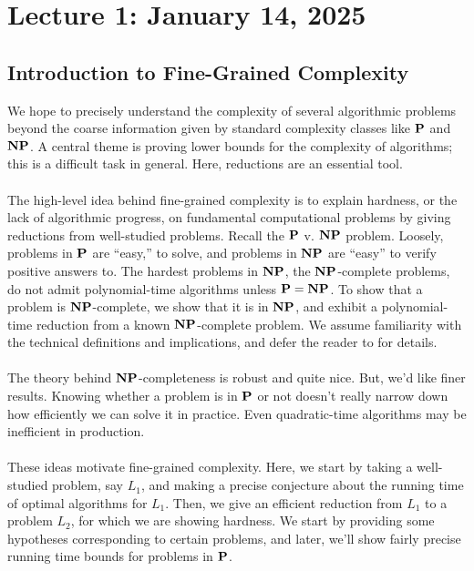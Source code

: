 \section{Lecture 1: January 14, 2025}

    \subsection{Introduction to Fine-Grained Complexity}
    
        We hope to precisely understand the complexity of several algorithmic problems beyond the coarse information given by standard complexity classes like \(\mathbf{P}\) and \(\mathbf{NP}\). A central theme is proving lower bounds for the complexity of algorithms; this is a difficult task in general. Here, reductions are an essential tool.
        \\
        \\
        The high-level idea behind fine-grained complexity is to explain hardness, or the lack of algorithmic progress, on fundamental computational problems by giving reductions from well-studied problems. Recall the \(\mathbf{P}\) v. \(\mathbf{NP}\) problem. Loosely, problems in \(\mathbf{P}\) are ``easy,'' to solve, and problems in \(\mathbf{NP}\) are ``easy'' to verify positive answers to. The hardest problems in \(\mathbf{NP}\), the \(\mathbf{NP}\)-complete problems, do not admit polynomial-time algorithms unless \(\mathbf{P}=\mathbf{NP}\). To show that a problem is \(\mathbf{NP}\)-complete, we show that it is in \(\mathbf{NP}\), and exhibit a polynomial-time reduction from a known \(\mathbf{NP}\)-complete problem. We assume familiarity with the technical definitions and implications, and defer the reader to \cite{hopcroft2001introduction,sipser2012introduction} for details.
        \\
        \\
        The theory behind \(\mathbf{NP}\)-completeness is robust and quite nice. But, we'd like finer results. Knowing whether a problem is in \(\mathbf{P}\) or not doesn't really narrow down how efficiently we can solve it in practice. Even quadratic-time algorithms may be inefficient in production.
        \\
        \\
        These ideas motivate fine-grained complexity. Here, we start by taking a well-studied problem, say \(L_1\), and making a precise conjecture about the running time of optimal algorithms for \(L_1\). Then, we give an efficient reduction from \(L_1\) to a problem \(L_2\), for which we are showing hardness. We start by providing some hypotheses corresponding to certain problems, and later, we'll show fairly precise running time bounds for problems in \(\mathbf{P}\).
